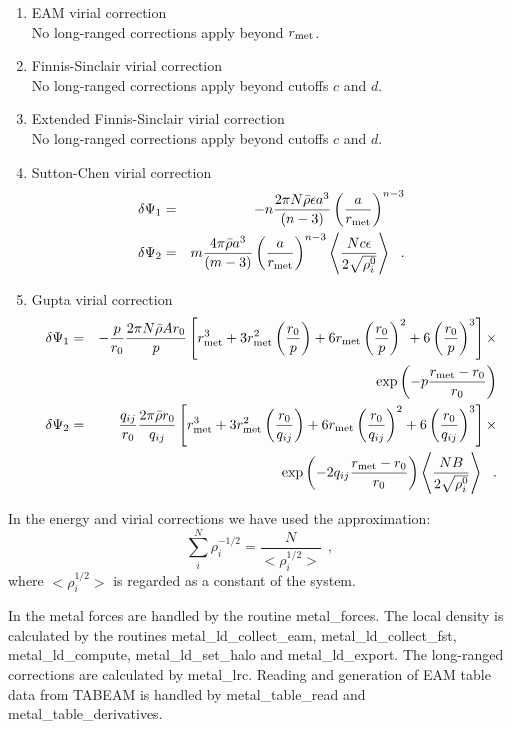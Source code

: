 \begin{enumerate}
\item EAM virial correction \\
No long-ranged corrections apply beyond $r_{\rm met}$.
\item Finnis-Sinclair virial correction \\
No long-ranged corrections apply beyond cutoffs $c$ and $d$.
\item Extended Finnis-Sinclair virial correction \\
No long-ranged corrections apply beyond cutoffs $c$ and $d$.
\item Sutton-Chen virial correction
\begin{eqnarray}
\delta \Psi_{1} &=& -n \frac{2 \pi N \bar{\rho} \epsilon a^{3}}{(n-3)}
\left( \frac{a}{r_{\rm met}} \right)^{n-3} \nonumber \\
\delta \Psi_{2} &=& m \frac{4 \pi \bar{\rho} a^{3}}{(m-3)} \left( \frac{a}{r_{\rm met}} \right)^{n-3}
\left< \frac{N c \epsilon}{2\sqrt{\rho_{i}^{0}}} \right>~~.
\end{eqnarray}
\item Gupta virial correction
\begin{eqnarray}
\delta \Psi_{1} &=& -\frac{p}{r_{0}} \frac{2 \pi N \bar{\rho} A r_{0}}{p}
\left[ r_{\rm met}^{3} + 3 r_{\rm met}^{2} \left(\frac{r_{0}}{p}\right) +
6 r_{\rm met} \left(\frac{r_{0}}{p}\right)^{2} + 6 \left(\frac{r_{0}}{p}\right)^{3} \right] \times \nonumber \\
& & \exp \left( -p \frac{r_{\rm met}-r_{0}}{r_{0}}\right) \nonumber \\
\delta \Psi_{2} &=& \frac{q_{ij}}{r_{0}} \frac{2 \pi \bar{\rho} r_{0}}{q_{ij}}
\left[ r_{\rm met}^{3} + 3 r_{\rm met}^{2} \left(\frac{r_{0}}{q_{ij}}\right) +
6 r_{\rm met} \left(\frac{r_{0}}{q_{ij}}\right)^{2} + 6 \left(\frac{r_{0}}{q_{ij}}\right)^{3} \right] \times \\
& & \exp \left( -2 q_{ij} \frac{r_{\rm met}-r_{0}}{r_{0}}\right)
\left< \frac{N B}{2\sqrt{\rho_{i}^{0}}} \right>~~. \nonumber
\end{eqnarray}
\end{enumerate}

In the energy and virial corrections we have used the approximation:
\begin{equation}
\sum_{i}^{N}\rho_{i}^{-1/2} = \frac{N}{<\rho_{i}^{1/2}>}~~,
\end{equation}
where $<\rho_{i}^{1/2}>$ is regarded as a constant of the system.

In \D the metal forces are handled by the routine {\sc
metal\_forces}.  The local density is calculated by the routines
{\sc metal\_ld\_collect\_eam}, {\sc metal\_ld\_collect\_fst},
{\sc metal\_ld\_compute}, {\sc metal\_ld\_set\_halo} and
{\sc metal\_ld\_export}.  The long-ranged corrections are calculated by
{\sc metal\_lrc}.  Reading and generation of EAM table data from TABEAM
is handled by {\sc metal\_table\_read} and {\sc metal\_table\_derivatives}.

